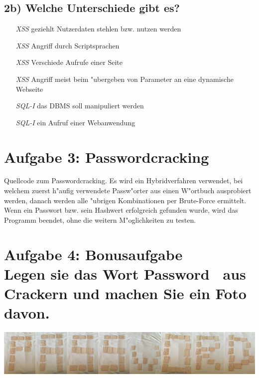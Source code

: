 \documentclass{scrartcl}
\begin{document}
\subsection*{2b) Welche Unterschiede gibt es?}
\begin{itemize}
\item[\textit{XSS}] geziehlt Nutzerdaten stehlen bzw. nutzen 
werden
\item[\textit{XSS}] Angriff durch Scriptsprachen
\item[\textit{XSS}] Verschiede Aufrufe einer Seite
\item[\textit{XSS}] Angriff meist beim "ubergeben von Parameter an eine 
dynamische Webseite
\item[\textit{SQL-I}] das DBMS soll manipuliert werden
\item[\textit{SQL-I}] ein Aufruf einer Webanwendung
\end{itemize}

\section*{Aufgabe 3: Passwordcracking}
Quellcode zum Passwordcracking. Es wird ein Hybridverfahren verwendet, bei 
welchem zuerst h"aufig verwendete Passw"orter aus einen W"ortbuch ausprobiert 
werden, danach werden alle "ubrigen Kombinationen per Brute-Force ermittelt. 
Wenn ein Passwort bzw. sein Hashwert erfolgreich gefunden wurde, wird das 
Programm beendet, ohne die weitern M"oglichkeiten zu testen.



\section*{Aufgabe 4: Bonusaufgabe \\Legen sie das Wort \dq Password\dq 
~aus Crackern und machen Sie ein Foto davon.}
\includegraphics[width=\textwidth]{ue07-04-password.png}
\end{document}
